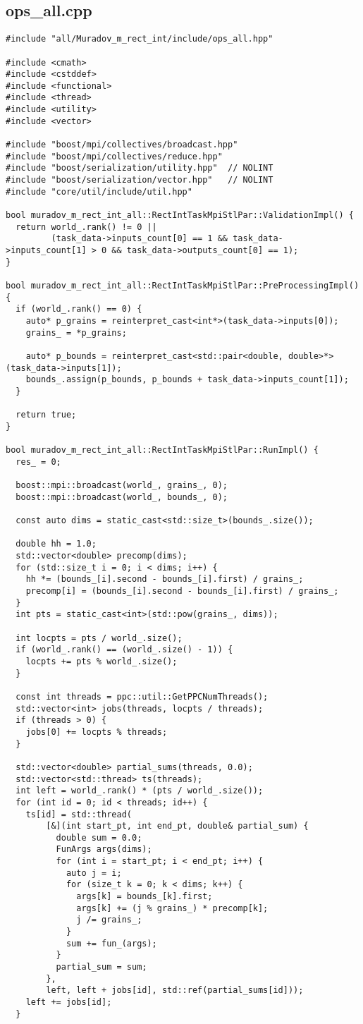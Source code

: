 \documentclass[12pt,a4paper]{extarticle}
\begin{document}
\subsection{ops\_all.cpp}
\begin{lstlisting}
#include "all/Muradov_m_rect_int/include/ops_all.hpp"

#include <cmath>
#include <cstddef>
#include <functional>
#include <thread>
#include <utility>
#include <vector>

#include "boost/mpi/collectives/broadcast.hpp"
#include "boost/mpi/collectives/reduce.hpp"
#include "boost/serialization/utility.hpp"  // NOLINT
#include "boost/serialization/vector.hpp"   // NOLINT
#include "core/util/include/util.hpp"

bool muradov_m_rect_int_all::RectIntTaskMpiStlPar::ValidationImpl() {
  return world_.rank() != 0 ||
         (task_data->inputs_count[0] == 1 && task_data->inputs_count[1] > 0 && task_data->outputs_count[0] == 1);
}

bool muradov_m_rect_int_all::RectIntTaskMpiStlPar::PreProcessingImpl() {
  if (world_.rank() == 0) {
    auto* p_grains = reinterpret_cast<int*>(task_data->inputs[0]);
    grains_ = *p_grains;

    auto* p_bounds = reinterpret_cast<std::pair<double, double>*>(task_data->inputs[1]);
    bounds_.assign(p_bounds, p_bounds + task_data->inputs_count[1]);
  }

  return true;
}

bool muradov_m_rect_int_all::RectIntTaskMpiStlPar::RunImpl() {
  res_ = 0;

  boost::mpi::broadcast(world_, grains_, 0);
  boost::mpi::broadcast(world_, bounds_, 0);

  const auto dims = static_cast<std::size_t>(bounds_.size());

  double hh = 1.0;
  std::vector<double> precomp(dims);
  for (std::size_t i = 0; i < dims; i++) {
    hh *= (bounds_[i].second - bounds_[i].first) / grains_;
    precomp[i] = (bounds_[i].second - bounds_[i].first) / grains_;
  }
  int pts = static_cast<int>(std::pow(grains_, dims));

  int locpts = pts / world_.size();
  if (world_.rank() == (world_.size() - 1)) {
    locpts += pts % world_.size();
  }

  const int threads = ppc::util::GetPPCNumThreads();
  std::vector<int> jobs(threads, locpts / threads);
  if (threads > 0) {
    jobs[0] += locpts % threads;
  }

  std::vector<double> partial_sums(threads, 0.0);
  std::vector<std::thread> ts(threads);
  int left = world_.rank() * (pts / world_.size());
  for (int id = 0; id < threads; id++) {
    ts[id] = std::thread(
        [&](int start_pt, int end_pt, double& partial_sum) {
          double sum = 0.0;
          FunArgs args(dims);
          for (int i = start_pt; i < end_pt; i++) {
            auto j = i;
            for (size_t k = 0; k < dims; k++) {
              args[k] = bounds_[k].first;
              args[k] += (j % grains_) * precomp[k];
              j /= grains_;
            }
            sum += fun_(args);
          }
          partial_sum = sum;
        },
        left, left + jobs[id], std::ref(partial_sums[id]));
    left += jobs[id];
  }


\end{lstlisting}
\end{document}
